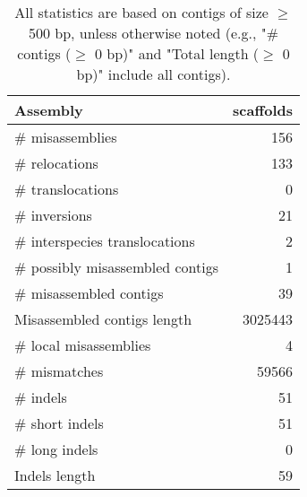 \documentclass[12pt,a4paper]{article}
\begin{document}
\begin{table}[ht]
\begin{center}
\caption{All statistics are based on contigs of size $\geq$ 500 bp, unless otherwise noted (e.g., "\# contigs ($\geq$ 0 bp)" and "Total length ($\geq$ 0 bp)" include all contigs).}
\begin{tabular}{|l*{1}{|r}|}
\hline
Assembly & scaffolds \\ \hline
\# misassemblies & 156 \\ \hline
\hspace{5mm}\# relocations & 133 \\ \hline
\hspace{5mm}\# translocations & 0 \\ \hline
\hspace{5mm}\# inversions & 21 \\ \hline
\hspace{5mm}\# interspecies translocations & 2 \\ \hline
\# possibly misassembled contigs & 1 \\ \hline
\# misassembled contigs & 39 \\ \hline
Misassembled contigs length & 3025443 \\ \hline
\# local misassemblies & 4 \\ \hline
\# mismatches & 59566 \\ \hline
\# indels & 51 \\ \hline
\hspace{5mm}\# short indels & 51 \\ \hline
\hspace{5mm}\# long indels & 0 \\ \hline
Indels length & 59 \\ \hline
\end{tabular}
\end{center}
\end{table}
\end{document}
